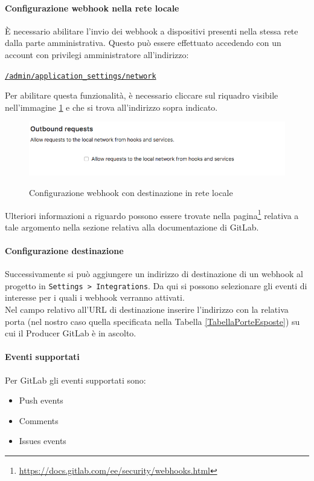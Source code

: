 	\paragraph{Configurazione webhook nella rete locale}
	È necessario abilitare l'invio dei webhook a dispositivi presenti nella stessa rete dalla parte amministrativa.
	Questo può essere effettuato accedendo con un account con privilegi amministratore all'indirizzo:
	\begin{center}
		\texttt{\url{/admin/application_settings/network}}
	\end{center}
	Per abilitare questa funzionalità, è necessario cliccare sul riquadro visibile nell'immagine \ref{ConfigWebGit} e che si trova all'indirizzo sopra indicato.
	\begin{figure}[H]
		\centering
		\includegraphics[width=13cm]{img/webhook_gitlab_setup.png}\\
		\caption{Configurazione webhook con destinazione in rete locale}
		\label{ConfigWebGit}
	\end{figure}
	Ulteriori informazioni a riguardo possono essere trovate nella pagina\footnote{\url{https://docs.gitlab.com/ee/security/webhooks.html}} relativa a tale argomento nella sezione relativa alla documentazione di GitLab.

	\paragraph{Configurazione destinazione}
	Successivamente si può aggiungere un indirizzo di destinazione di un webhook al progetto in \texttt{Settings > Integrations}.
	Da qui si possono selezionare gli eventi di interesse per i quali i webhook verranno attivati.\\
	Nel campo relativo all'URL di destinazione inserire l'indirizzo con la relativa porta (nel nostro caso quella specificata nella Tabella \ref{TabellaPorteEsposte}) su cui il Producer GitLab è in ascolto.
	\paragraph{Eventi supportati}
	Per GitLab gli eventi supportati sono:
	\begin{itemize}
		\item Push events
		\item Comments
		\item Issues events
	\end{itemize}

